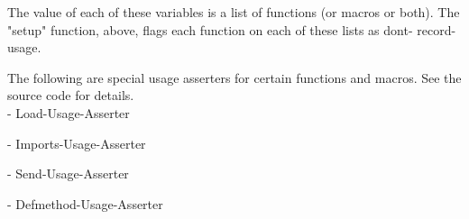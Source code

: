   The value of each of these variables is a list of functions (or 
macros  or  both).  The "setup" function, above,  flags each
function on each of these lists as dont- record-usage.



{}
The following are special usage asserters for certain
functions and macros. See the source code for details.\\

   - Load-Usage-Asserter

   - Imports-Usage-Asserter

   - Send-Usage-Asserter

   - Defmethod-Usage-Asserter

